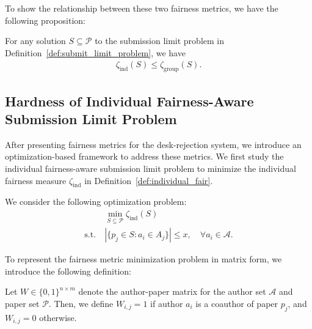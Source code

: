 To show the relationship between these two fairness metrics, we have the following proposition:

\begin{proposition}\label{lem:fair_metric_ineq}
    For any solution $S\subseteq \mathcal{P}$ to the submission limit problem in Definition~\ref{def:submit_limit_problem}, we have 
    \begin{align*}
        \zeta_{\mathrm{ind}}(S) \leq \zeta_{\mathrm{group}}(S).
    \end{align*}
\end{proposition}


\subsection{Hardness of Individual Fairness-Aware Submission Limit Problem}\label{sec:indi_fair_hard}

After presenting fairness metrics for the desk-rejection system, we introduce an optimization-based framework to address these metrics. We first study the individual fairness-aware submission limit problem to minimize the individual fairness measure $\zeta_{\mathrm{ind}}$ in Definition~\ref{def:individual_fair}. 


\begin{definition}\label{def:ind_fair_min}
    We consider the following optimization problem:
\begin{align*}
    & ~ \min_{S \subseteq \mathcal{P}} \zeta_{\mathrm{ind}}(S) \\
    \mathrm{s.t.} & ~ |\{p_j \in S : a_i \in A_j\}| \leq x, \quad \forall a_i \in \mathcal{A}.
\end{align*}
\end{definition}

To represent the fairness metric minimization problem in matrix form, we introduce the following definition:

\begin{definition}\label{def:author_paper_mat}
    Let $W \in \{0, 1\}^{n \times m}$ denote the author-paper matrix for the author set $\mathcal{A}$ and paper set $\mathcal{P}$. Then, we define $W_{i,j} = 1$ if author $a_i$ is a coauthor of paper $p_j$, and $W_{i,j} = 0$ otherwise.
\end{definition}

